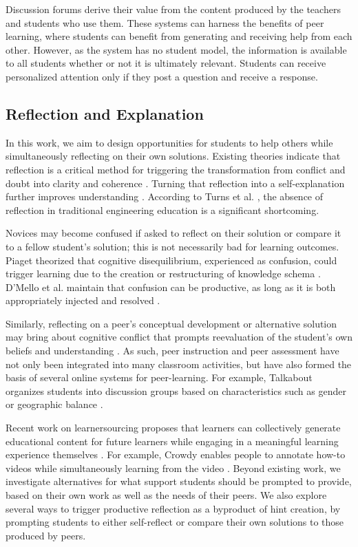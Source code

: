 Discussion forums derive their value from the content produced by the teachers and students who use them. These systems can harness the benefits of peer learning, where students can benefit from generating and receiving help from each other. However, as the system has no student model, the information is available to all students whether or not it is ultimately relevant. Students can receive personalized attention only if they post a question and receive a response. 

\subsection{Reflection and Explanation}
In this work, we aim to design opportunities for students to help others while simultaneously reflecting on their own solutions. Existing theories indicate that reflection is a critical method for triggering the transformation from conflict and doubt into clarity and coherence \cite{dewey1933}. Turning that reflection into a self-explanation further improves understanding \cite{selfexplanation}. According to Turns et al. \cite{asee}, the absence of reflection in traditional engineering education is a significant shortcoming. 

Novices may become confused if asked to reflect on their solution or compare it to a fellow student’s solution; this is not necessarily bad for learning outcomes. Piaget theorized that cognitive disequilibrium, experienced as confusion, could trigger learning due to the creation or restructuring of knowledge schema \cite{disequilibrium}. D’Mello et al. maintain that confusion can be productive, as long as it is both appropriately injected and resolved \cite{productiveconfusion}. 

Similarly, reflecting on a peer’s conceptual development or alternative solution may bring about cognitive conflict that prompts reevaluation of the student’s own beliefs and understanding \cite{kavanagh}. As such, peer instruction \cite{mazur} and peer assessment \cite{peerassessment} have not only been integrated into many classroom activities, but have also formed the basis of several online systems for peer-learning. For example, Talkabout organizes students into discussion groups based on characteristics such as gender or geographic balance \cite{talkabout}.

Recent work on learnersourcing proposes that learners can collectively generate educational content for future learners while engaging in a meaningful learning experience themselves \cite{kim2013learnersourcing,weir2015,mitros2015}. For example, Crowdy enables people to annotate how-to videos while simultaneously learning from the video \cite{weir2015}. Beyond existing work, we investigate alternatives for what support students should be prompted to provide, based on their own work as well as the needs of their peers. We also explore several ways to trigger productive reflection as a byproduct of hint creation, by prompting students to either self-reflect or compare their own solutions to those produced by peers. 
